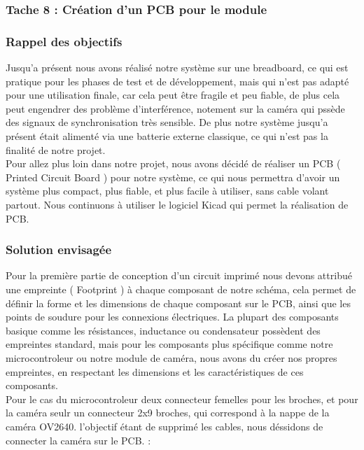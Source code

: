 \subsubsection{Tache 8 : Création d'un PCB pour le module}

\subsubsection*{Rappel des objectifs}

Jusqu'a présent nous avons réalisé notre système sur une breadboard, ce qui est pratique pour les phases de test et de développement, mais qui n'est pas adapté pour une utilisation finale,
car cela peut être fragile et peu fiable, de plus cela peut engendrer des problème d'interférence, notement sur la caméra qui pssède des signaux de synchronisation très sensible.
De plus notre système jusqu'a présent était alimenté via une batterie externe classique, ce qui n'est pas la finalité de notre projet.
\\

Pour allez plus loin dans notre projet, nous avons décidé de réaliser un PCB ( Printed Circuit Board ) pour notre système, ce qui nous permettra d'avoir un système plus compact, plus fiable, 
et plus facile à utiliser, sans cable volant partout. Nous continuons à utiliser le logiciel Kicad qui permet la réalisation de PCB.
\\

\subsubsection*{Solution envisagée}

Pour la première partie de conception d'un circuit imprimé nous devons attribué une empreinte ( Footprint ) à chaque composant de notre schéma, cela permet de définir la forme et les dimensions 
de chaque composant sur le PCB, ainsi que les points de soudure pour les connexions électriques. La plupart des composants basique comme les résistances,
inductance ou condensateur possèdent des empreintes standard, mais pour les composants plus spécifique comme notre microcontroleur ou notre module de caméra, nous avons du créer nos propres empreintes, 
en respectant les dimensions et les caractéristiques de ces composants.
\\

Pour le cas du microcontroleur deux connecteur femelles pour les broches, et pour la caméra seulr un connecteur 2x9 broches, qui correspond à la nappe de la caméra OV2640.
l'objectif étant de supprimé les cables, nous déssidons de connecter la caméra sur le PCB. : 
\\

